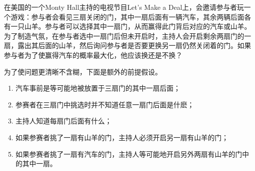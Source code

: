 \begin{example}
  在美国的一个Monty Hall主持的电视节目Let's Make a Deal上，会邀请参与者玩一个游戏：参与者会看见三扇关闭的门，其中一扇后面有一辆汽车，其余两辆后面各有一只山羊。参与者可以选择其中一扇门，从而赢得此门背后对应的汽车或山羊。为了制造气氛，在参与者选中一扇门后但未开启时，主持人会开启剩余两扇门的一扇，露出其后面的山羊，然后询问参与者是否要更换另一扇仍然关闭着的门。如果参与者为了使赢得汽车的概率最大化，他应该换还是不换？

  为了使问题更清晰不含糊，下面是额外的前提假设。
  \begin{enumerate}
  \item 汽车事前是等可能地被放置于三扇门的其中一扇后面；
  \item 参赛者在三扇门中挑选时并不知道任意一扇门后面是什麽；
  \item 主持人知道每扇门后面有什么；
  \item 如果参赛者挑了一扇有山羊的门，主持人必须开启另一扇有山羊的门；
  \item 如果参赛者挑了一扇有汽车的门，主持人等可能地开启另外两扇有山羊的门中的其中一扇。
  \end{enumerate}
\end{example}
